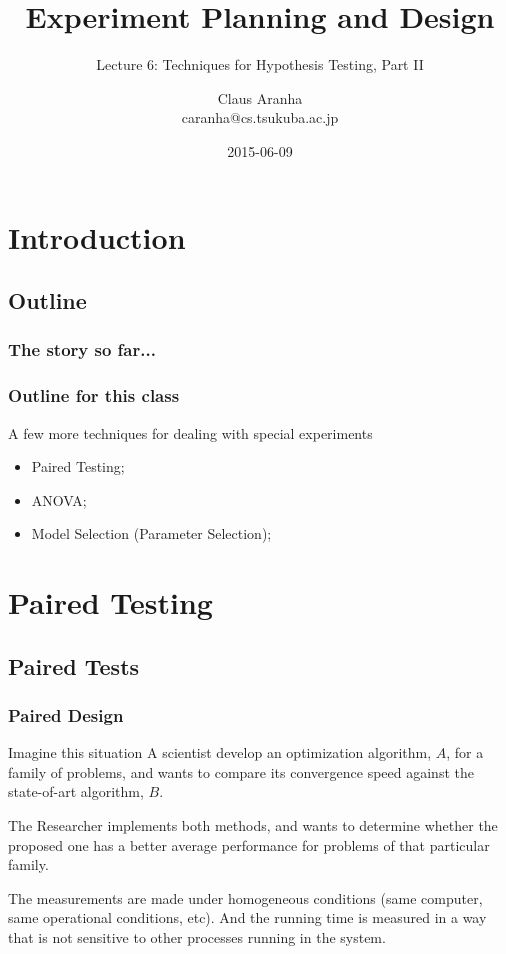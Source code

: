 \documentclass[10pt]{beamer}
\title[]{Experiment Planning and Design}
\subtitle[]{Lecture 6: Techniques for Hypothesis Testing, Part II}
\author[Claus Aranha]{Claus Aranha\\{\footnotesize caranha@cs.tsukuba.ac.jp}}
\institute{Department of Computer Science}
\date{2015-06-09}
\begin{document}
\section{Introduction}
\subsection{Outline}

\begin{frame}
  \maketitle
\end{frame}


\begin{frame}
  \frametitle{The story so far...}
\end{frame}

\begin{frame}
  \frametitle{Outline for this class}
  \begin{block}{}
    A few more techniques for dealing with special experiments
  \end{block}
  \begin{itemize}
  \item Paired Testing;
  \item ANOVA;
  \item Model Selection (Parameter Selection);
  \end{itemize}
\end{frame}

\section{Paired Testing}

\subsection{Paired Tests}

\begin{frame}
  \frametitle{Paired Design}
  \begin{block}{Imagine this situation}
    A scientist develop an optimization algorithm, $A$, for a family
    of problems, and wants to compare its convergence speed against
    the state-of-art algorithm, $B$.

    \medskip

    The Researcher implements both methods, and wants to determine
    whether the proposed one has a better average performance for
    problems of that particular family.

    \medskip

    The measurements are made under homogeneous conditions (same
    computer, same operational conditions, etc). And the running time
    is measured in a way that is not sensitive to other processes
    running in the system.
  \end{block}
\end{frame}
\end{document}
